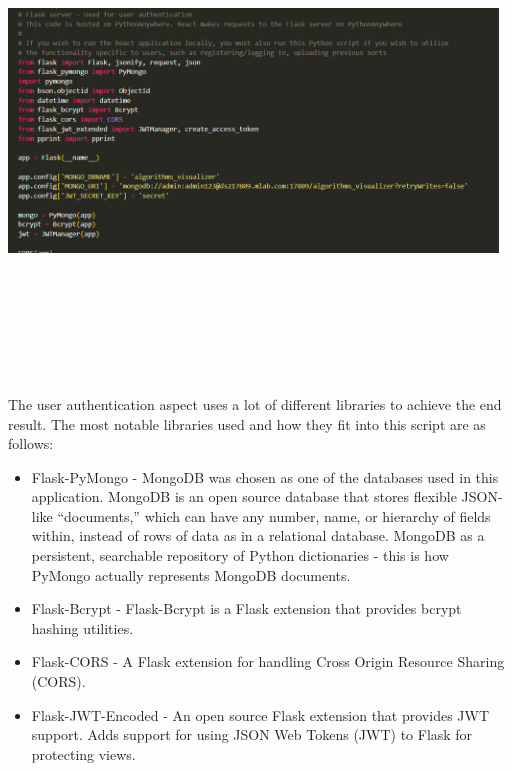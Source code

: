 \begin{center}
    \includegraphics[width=13cm,height=13cm,keepaspectratio]{images/backend1}
\end{center}
The user authentication aspect uses a lot of different libraries to achieve the end result. The most notable libraries used and how they fit into this script are as follows:

\begin{itemize}
    \item Flask-PyMongo - MongoDB was chosen as one of the databases used in this application. MongoDB is an open source database that stores flexible JSON-like “documents,” which can have any number, name, or hierarchy of fields within, instead of rows of data as in a relational database. MongoDB as a persistent, searchable repository of Python dictionaries - this is how PyMongo actually represents MongoDB documents.
    \item Flask-Bcrypt - Flask-Bcrypt is a Flask extension that provides bcrypt hashing utilities.
    \item Flask-CORS - A Flask extension for handling Cross Origin Resource Sharing (CORS).
    \item Flask-JWT-Encoded - An open source Flask extension that provides JWT support. Adds support for using JSON Web Tokens (JWT) to Flask for protecting views. 
\end{itemize}

